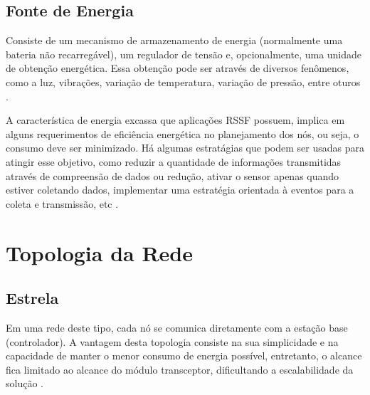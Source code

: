 \subsection{Fonte de Energia}
Consiste de um mecanismo de armazenamento de energia (normalmente uma bateria não recarregável), um regulador
de tensão e, opcionalmente, uma unidade de obtenção energética. Essa obtenção pode ser através de diversos
fenômenos, como a luz, vibrações, variação de temperatura, variação de pressão, entre oturos
\cite{kuorilehto2007,karl_willig2005}.

A característica de energia excassa que aplicações RSSF possuem, implica em alguns requerimentos de eficiência
energética no planejamento dos nós, ou seja, o consumo deve ser minimizado. Há algumas estratágias que podem
ser usadas para atingir esse objetivo, como reduzir a quantidade de informações transmitidas através de
compreensão de dados ou redução, ativar o sensor apenas quando estiver coletando dados, implementar uma
estratégia orientada à eventos para a coleta e transmissão, etc \cite{kuorilehto2007,townsend_arms2005}.

\section{Topologia da Rede}
\subsection{Estrela}
Em uma rede deste tipo, cada nó se comunica diretamente com a estação base (controlador). A vantagem
desta topologia consiste na sua simplicidade e na capacidade de manter o menor consumo de energia possível,
entretanto, o alcance fica limitado ao alcance do módulo transceptor, dificultando a escalabilidade da solução
\cite{dargie_poellabauer2010,townsend_arms2005}.

